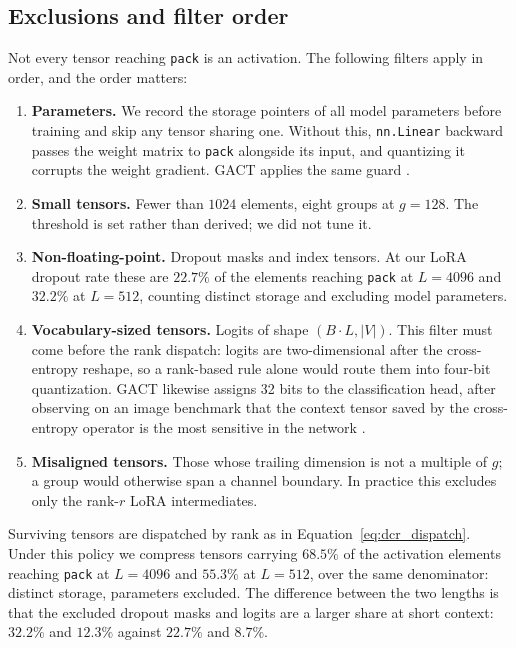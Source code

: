 \documentclass[11pt,letterpaper]{article}
\begin{document}
\subsection{Exclusions and filter order}
\label{sec:method_filter}

Not every tensor reaching \texttt{pack} is an activation. The following filters apply in order, and the order matters:

\begin{enumerate}\itemsep2pt 
\item \textbf{Parameters.} We record the storage pointers of all model parameters before training and skip any tensor sharing one. Without this, \texttt{nn.Linear} backward passes the weight matrix to \texttt{pack} alongside its input, and quantizing it corrupts the weight gradient. GACT applies the same guard \citep{liu2022gact}. 
\item \textbf{Small tensors.} Fewer than $1024$ elements, eight groups at $g{=}128$. The threshold is set rather than derived; we did not tune it. \item \textbf{Non-floating-point.} Dropout masks and index tensors. At our LoRA dropout rate these are $22.7\%$ of the elements reaching \texttt{pack} at $L{=}4096$ and $32.2\%$ at $L{=}512$, counting distinct storage and excluding model parameters. 
\item \textbf{Vocabulary-sized tensors.} Logits of shape $(B \cdot L, |V|)$. This filter must come before the rank dispatch: logits are two-dimensional after the cross-entropy reshape, so a rank-based rule alone would route them into four-bit quantization. GACT likewise assigns 32 bits to the classification head, after observing on an image benchmark that the context tensor saved by the cross-entropy operator is the most sensitive in the network \citep{liu2022gact}. 
\item \textbf{Misaligned tensors.} Those whose trailing dimension is not a multiple of $g$; a group would otherwise span a channel boundary. In practice this excludes only the rank-$r$ LoRA intermediates. 
\end{enumerate}

Surviving tensors are dispatched by rank as in Equation~\ref{eq:dcr_dispatch}. Under this policy we compress tensors carrying $68.5\%$ of the activation elements reaching \texttt{pack} at $L{=}4096$ and $55.3\%$ at $L{=}512$, over the same denominator: distinct storage, parameters excluded. The difference between the two lengths is that the excluded dropout masks and logits are a larger share at short context: $32.2\%$ and $12.3\%$ against $22.7\%$ and $8.7\%$.
\end{document}
